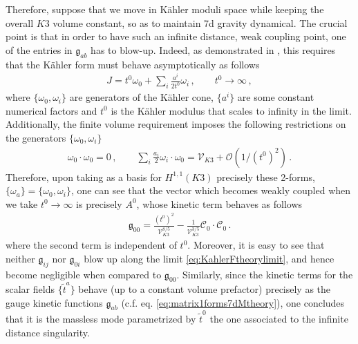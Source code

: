 Therefore, suppose that we move in K\"ahler moduli space while keeping the overall $K3$ volume constant, so as to maintain 7d gravity dynamical. The crucial point is that in order to have such an infinite distance, weak coupling point, one of the entries in $\mathfrak{g}_{a b}$ has to blow-up. Indeed, as demonstrated in \cite{Lee:2019xtm}, this requires that the K\"ahler form must behave asymptotically as follows
%
\begin{align}\label{eq:KahlerFtheorylimit}
			J= t^0 \omega_0 + \sum_i \frac{a^i}{2t^0} \omega_i\, , \qquad t^0 \to \infty\, ,    
\end{align}
%
where $\{\omega_0, \omega_i\}$ are generators of the K\"ahler cone, $\{a^i\}$ are some constant numerical factors and $t^0$ is the K\"ahler modulus that scales to infinity in the limit. Additionally, the finite volume requirement imposes the following restrictions on the generators $\{\omega_0, \omega_i\}$ \cite{Lee:2019xtm}
%
\begin{align}
			\omega_0 \cdot \omega_0 = 0\, , \qquad \sum_i \frac{a_i}{2} \omega_i \cdot \omega_0= \mathcal{V}_{K3} + \mathcal{O} (1/(t^0)^2)\, .    
\end{align}
%
Therefore, upon taking as a basis for $H^{1,1}(K3)$ precisely these 2-forms, $\lbrace \omega_a \rbrace = \lbrace \omega_0, \omega_i \rbrace$, one can see that the vector which becomes weakly coupled when we take $t^0 \to \infty$ is precisely $A^0$, whose kinetic term behaves as follows
%
\begin{align}\label{eq:gaugecoupling7d}
			\mathfrak{g}_{0 0} = \frac{(t^0)^2}{\mathcal{V}_{K3}^{8/5}} - \frac{1}{\mathcal{V}_{K3}^{3/5}}\mathcal{C}_0 \cdot \mathcal{C}_0\, .    
\end{align}
%
where the second term is independent of $t^0$. Moreover, it is easy to see that neither $\mathfrak{g}_{i j}$ nor $\mathfrak{g}_{0 i}$ blow up along the limit \eqref{eq:KahlerFtheorylimit}, and hence become negligible when compared to $\mathfrak{g}_{0 0}$. Similarly, since the kinetic terms for the scalar fields $\{ \tilde{t}^a\}$ behave (up to a constant volume prefactor) precisely as the gauge kinetic functions $\mathfrak{g}_{a b}$ (c.f. eq. \eqref{eq:matrix1forms7dMtheory}), one concludes that it is the massless mode parametrized by $\tilde{t}^0$ the one associated to the infinite distance singularity.

